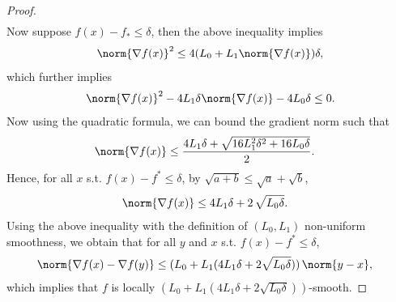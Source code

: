 \documentclass[10pt]{article} %
\begin{document}
\begin{proof}
\begin{align*}
    \end{align*}    
    Now suppose $f(x) - f_{*} \leq \delta$, then the above inequality implies 
    \begin{align*}
        \norm{\nabla f(x)}^2 \leq 4(L_{0} + L_{1}\norm{\nabla f(x)})\delta,
    \end{align*}    
    which further implies
    \begin{align*}
        \norm{\nabla f(x)}^2 - 4L_{1}\delta\norm{\nabla f(x)}- 4L_{0}\delta \leq 0.
    \end{align*}    
    Now using the quadratic formula, we can bound the gradient norm such that
    \begin{align*}
        \norm{\nabla f(x)} &\leq \frac{4L_{1}\delta + \sqrt{16L_{1}^2\delta^2 + 16L_{0}\delta}}{2} .
    \end{align*} 
    Hence, for all $x$ s.t. $f(x) - f^* \leq \delta$, by $\sqrt{a+b} \leq \sqrt{a} + \sqrt{b}$,
    \begin{align*}
        \norm{\nabla f(x)} &\leq 4L_{1}\delta + 2 \, \sqrt{L_{0}\delta}.
    \end{align*}   
    Using the above inequality with the definition of $(L_0, L_1)$ non-uniform smoothness, we obtain that for all $y$ and $x$ s.t. $f(x) - f^* \leq \delta$, 
    \begin{align*}
    \norm{\nabla f(x) - \nabla f(y)} & \leq (L_{0} + L_{1}(4L_{1}\delta + 2\sqrt{L_{0}\delta})) \, \norm{y - x},     
    \end{align*}
    which implies that $f$ is locally $(L_{0} + L_{1}(4L_{1}\delta + 2\sqrt{L_{0}\delta}))$-smooth. 

\end{proof}

\end{document}
